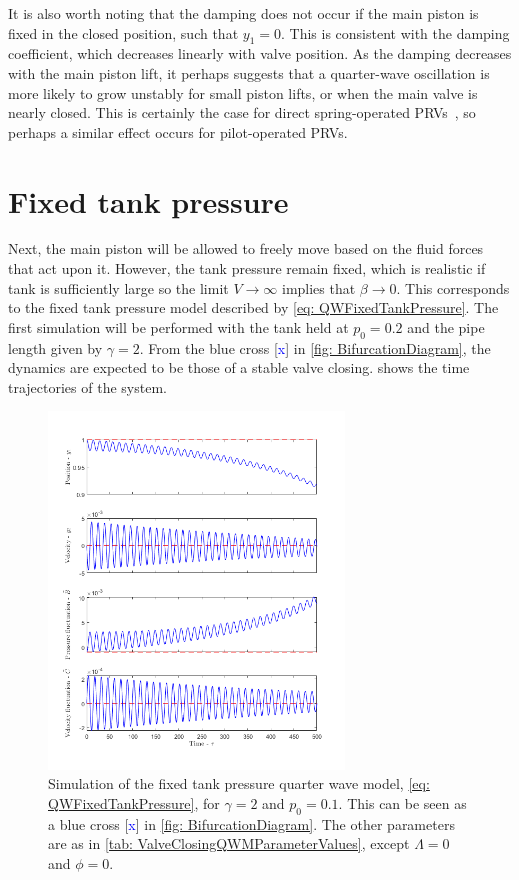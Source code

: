 It is also worth noting that the damping does not occur if the main piston is fixed in the closed position, such that $y_1 = 0$. This is consistent with the damping coefficient, which decreases linearly with valve position. As the damping decreases with the main piston lift, it perhaps suggests that a quarter-wave oscillation is more likely to grow unstably for small piston lifts, or when the main valve is nearly closed. This is certainly the case for direct spring-operated PRVs~\cite{Hos2017DynamicRecommendations}, so perhaps a similar effect occurs for pilot-operated PRVs.

\section{Fixed tank pressure}

Next, the main piston will be allowed to freely move based on the fluid forces that act upon it. However, the tank pressure remain fixed, which is realistic if tank is sufficiently large so the limit $V \rightarrow \infty$ implies that $\beta \rightarrow 0$. This corresponds to the fixed tank pressure model described by \cref{eq: QWFixedTankPressure}. The first simulation will be performed with the tank held at $p_0 = 0.2$ and the pipe length given by $\gamma = 2$. From the blue cross [\textcolor{Blue}{x}] in \cref{fig: BifurcationDiagram}, the dynamics are expected to be those of a stable valve closing.  shows the time trajectories of the system.
~
\begin{figure}[ht]
    \centering
    \includegraphics[width=0.7\textwidth]{Figures/CloseToHopf/HopfStable.png}
    \caption{Simulation of the fixed tank pressure quarter wave model, \cref{eq: QWFixedTankPressure}, for $\gamma = 2$ and $p_0 = 0.1$. This can be seen as a blue cross [\textcolor{Blue}{x}] in \cref{fig: BifurcationDiagram}. The other parameters are as in \cref{tab: ValveClosingQWMParameterValues}, except $\Lambda=0$ and $\phi=0$.}
    \label{fig: StableHopf}
\end{figure}

